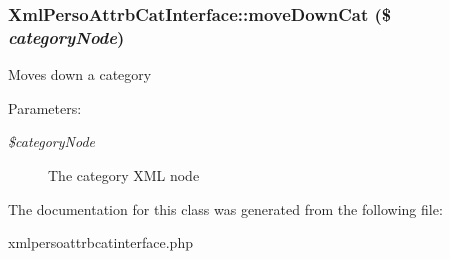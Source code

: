 \subsubsection{\setlength{\rightskip}{0pt plus 5cm}XmlPersoAttrbCatInterface::moveDownCat (\$ {\em categoryNode})}\label{classXmlPersoAttrbCatInterface_d460ea461bce0c848e97a6e0d3b6c897}


Moves down a category

\begin{Desc}
\item[Parameters:]
\begin{description}
\item[{\em \$categoryNode}]The category XML node \end{description}
\end{Desc}


The documentation for this class was generated from the following file:\begin{CompactItemize}
\item 
xmlpersoattrbcatinterface.php\end{CompactItemize}
